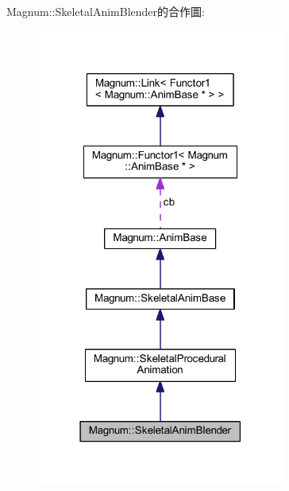 Magnum\+:\+:Skeletal\+Anim\+Blender的合作圖\+:\nopagebreak
\begin{figure}[H]
\begin{center}
\leavevmode
\includegraphics[width=231pt]{class_magnum_1_1_skeletal_anim_blender__coll__graph}
\end{center}
\end{figure}
